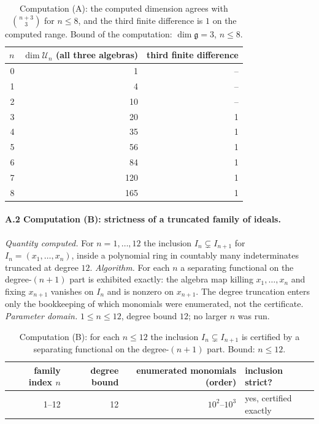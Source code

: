 \documentclass[11pt]{ctexart}
\theoremstyle{plain}
\theoremstyle{definition}
\theoremstyle{remark}
\newcommand{\gl}{\mathfrak{g}}
\newcommand{\UU}{\mathcal{U}}
\begin{document}
\begin{table}[h]
\centering
\begin{tabular}{rrr}
\toprule
$n$ & $\dim\UU_n$ (all three algebras) & third finite difference \\
\midrule
0 & 1 & -- \\
1 & 4 & -- \\
2 & 10 & -- \\
3 & 20 & 1 \\
4 & 35 & 1 \\
5 & 56 & 1 \\
6 & 84 & 1 \\
7 & 120 & 1 \\
8 & 165 & 1 \\
\bottomrule
\end{tabular}
\caption{Computation (A): the computed dimension agrees with $\binom{n+3}{3}$ for
$n\le8$, and the third finite difference is $1$ on the computed range. Bound of the
computation: $\dim\gl=3$, $n\le8$.}
\end{table}

\paragraph{A.2 Computation (B): strictness of a truncated family of ideals.}
\emph{Quantity computed.} For $n=1,\dots,12$ the inclusion $I_n\subsetneq I_{n+1}$ for
$I_n=(x_1,\dots,x_n)$, inside a polynomial ring in countably many indeterminates
truncated at degree $12$.
\emph{Algorithm.} For each $n$ a separating functional on the degree-$(n{+}1)$ part is
exhibited exactly: the algebra map killing $x_1,\dots,x_n$ and fixing $x_{n+1}$
vanishes on $I_n$ and is nonzero on $x_{n+1}$. The degree truncation enters only the
bookkeeping of which monomials were enumerated, not the certificate.
\emph{Parameter domain.} $1\le n\le12$, degree bound $12$; no larger $n$ was run.

\begin{table}[h]
\centering
\begin{tabular}{rrrl}
\toprule
family index $n$ & degree bound & enumerated monomials (order) & inclusion strict? \\
\midrule
1--12 & 12 & $10^{2}$--$10^{3}$ & yes, certified exactly \\
\bottomrule
\end{tabular}
\caption{Computation (B): for each $n\le12$ the inclusion $I_n\subsetneq I_{n+1}$ is
certified by a separating functional on the degree-$(n{+}1)$ part. Bound: $n\le12$.}
\end{table}
\end{document}
